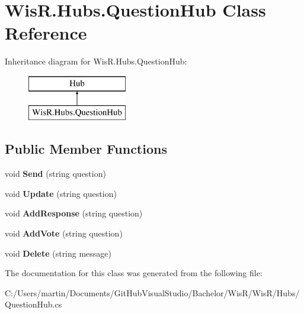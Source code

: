 \hypertarget{class_wis_r_1_1_hubs_1_1_question_hub}{}\section{Wis\+R.\+Hubs.\+Question\+Hub Class Reference}
\label{class_wis_r_1_1_hubs_1_1_question_hub}
Inheritance diagram for Wis\+R.\+Hubs.\+Question\+Hub\+:\begin{figure}[H]
\begin{center}
\leavevmode
\includegraphics[height=2.000000cm]{class_wis_r_1_1_hubs_1_1_question_hub}
\end{center}
\end{figure}
\subsection*{Public Member Functions}
\begin{DoxyCompactItemize}
\item 
\hypertarget{class_wis_r_1_1_hubs_1_1_question_hub_a0d4a51371cc31fa14a2577fa018ac26d}{}void {\bfseries Send} (string question)\label{class_wis_r_1_1_hubs_1_1_question_hub_a0d4a51371cc31fa14a2577fa018ac26d}

\item 
\hypertarget{class_wis_r_1_1_hubs_1_1_question_hub_a475a8a856aa026954cdbba48bd4dfc59}{}void {\bfseries Update} (string question)\label{class_wis_r_1_1_hubs_1_1_question_hub_a475a8a856aa026954cdbba48bd4dfc59}

\item 
\hypertarget{class_wis_r_1_1_hubs_1_1_question_hub_a7b3ce353d71cdab5ff59cf4ed39cc045}{}void {\bfseries Add\+Response} (string question)\label{class_wis_r_1_1_hubs_1_1_question_hub_a7b3ce353d71cdab5ff59cf4ed39cc045}

\item 
\hypertarget{class_wis_r_1_1_hubs_1_1_question_hub_a3db0df5dda13ce054f13ee59d159fec0}{}void {\bfseries Add\+Vote} (string question)\label{class_wis_r_1_1_hubs_1_1_question_hub_a3db0df5dda13ce054f13ee59d159fec0}

\item 
\hypertarget{class_wis_r_1_1_hubs_1_1_question_hub_a2ed7d8ae534a5bb71d0bd09a7e4bc0bc}{}void {\bfseries Delete} (string message)\label{class_wis_r_1_1_hubs_1_1_question_hub_a2ed7d8ae534a5bb71d0bd09a7e4bc0bc}

\end{DoxyCompactItemize}


The documentation for this class was generated from the following file\+:\begin{DoxyCompactItemize}
\item 
C\+:/\+Users/martin/\+Documents/\+Git\+Hub\+Visual\+Studio/\+Bachelor/\+Wis\+R/\+Wis\+R/\+Hubs/Question\+Hub.\+cs\end{DoxyCompactItemize}
